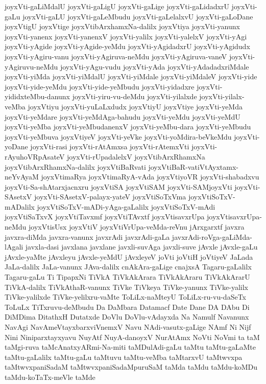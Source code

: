 {joyxVti-gaLiMdalU
joyxVti-gaLigU
joyxVti-gaLige
joyxVti-gaLidadxrU
joyxVti-gaLu
joyxVti-gaLU
joyxVti-gaLeMbudu
joyxVti-gaLelalxvU
joyxVti-gaLoDane
joyxVtigU
joyxVtige
joyxVtibArxhamxNa-dalilx
joyxVtiya
joyxVti-yanunx
joyxVti-yanenx
joyxVti-yanenxV
joyxVti-yalilx
joyxVti-yalelxV
joyxVti-yAgi
joyxVti-yAgide
joyxVti-yAgide-yeMdu
joyxVti-yAgidadxrU
joyxVti-yAgidudx
joyxVti-yAgiru-vanu
joyxVti-yAgiruva-neMdu
joyxVti-yAgiruva-vaneV
joyxVti-yAgiruvu-neMdu
joyxVti-yAgu-vudu
joyxVti-yAda
joyxVti-yAdadadxriMdale
joyxVti-yiMda
joyxVti-yiMdalU
joyxVti-yiMdale
joyxVti-yiMdaleV
joyxVti-yide
joyxVti-yide-yeMdu
joyxVti-yide-yeMbudu
joyxVti-yidadxre
joyxVti-yididxteMbu-danunx
joyxVti-yiru-vu-deMdu
joyxVti-yilalxde
joyxVti-yilalx-veMba
joyxVtiyu
joyxVti-yuLaLxdudx
joyxVtiyU
joyxVtiye
joyxVti-yeMda
joyxVti-yeMdare
joyxVti-yeMdAga-bahudu
joyxVti-yeMdu
joyxVti-yeMdU
joyxVti-yeMba
joyxVti-yeMbudanenxV
joyxVti-yeMbu-dara
joyxVti-yeMbudu
joyxVti-yeMbuva
joyxVtiyeV
joyxVti-yeVke
joyxVti-yoMdira-beVkeMdu
joyxVti-yoDane
joyxVti-rasi
joyxVti-rAtAmxsa
joyxVti-rAtemxVti
joyxVti-rAyuhoVRpAsateV
joyxVti-rUpadalelxV
joyxVtibArxRhamxNa
joyxVtibArxRhamxNa-dalilx
joyxVtiBaRvati
joyxVtiBaR-vatiVtAyxtamx-neYvAyaM
joyxVtimaRya
joyxVtimaRyA-vAda
joyxVtiyoVR
joyxVti-shabadxvu
joyxVti-Sa-shAtarxjacnxru
joyxVtiSA
joyxVtiSAM
joyxVti-SAMjoyxVti
joyxVti-SAsetxV
joyxVti-SAsetxV-palayx-yateV
joyxVtiSoTxVma
joyxVtiSoTxV-mADalilx
joyxVtiSoTxV-mADi-yAga-gaLalilx
joyxVtiSoTxV-mAdi
joyxVtiSaTxvX
joyxVtiTavxmf
joyxVtiTAvxtf
joyxVtisavxrUpa
joyxVtisavxrUpa-neMdu
joyxVtisUsx
joyxVtiV
joyxVtiVrUpa-veMda-reVnu
jArxgarxtf
javxra
javxra-diMda
javxra-vanunx
javxrAdi
javxrAdi-gaLa
javxrAdi-roVga-gaLiMda-lAgali
javxla-dasi
javxlana
javxlane
javxli-suvAga
javxli-suve
jAvxle
jAvxle-gaLu
jAvxle-yaMte
jAvxleyu
jAvxle-yeMdU
jAvxleyeV
joVti
joVtiH
joVtiyeV
JaLada
JaLa-dalilx
JaLa-vanunx
JAva-dalilx
cnAkAra-gaLige
cnajxsA
Tagaru-gaLalilx
Tagaru-gaLu
Ti
TipapxNi
TiVkA
TiVkAkArara
TiVkAkAraru
TiVkAkArarU
TiVkA-dalilx
TiVkAthaR-vanunx
TiVke
TiVkeya
TiVke-yanunx
TiVke-yalilx
TiVke-yalilxde
TiVke-yelilxru-vaMte
ToLiLx-naMteyU
ToLiLx-ru-vu-daSeTx
ToLuLx
TiTxruvu-deMbudu
Da
DaMbara
Datamacf
Date
Dane
DA
DAbu
Di
DiMDima
DitathxH
Dutatxde
DoVlu
DoVlu-vAdayxda
Na
Namulf
Navanunx
NavAgi
NavAmeVtayxbarxviVnemxV
Navu
NAdi-vasutx-gaLige
NAmf
Ni
Nijf
Nini
Niniparxtayxyavu
NuyAtf
NuyA-danoyxV
NurAtAmx
NoVti
NoVmi
ta
taM
taMgi-ruva
taMcAnatxyARmi-Na-miti
taMDulAdi-gaLu
taMtu
taMtu-gaLaMte
taMtu-gaLalilx
taMtu-gaLu
taMtuvu
taMtu-veMba
taMtarxvU
taMtwvxpa
taMtwvxpaniSadaM
taMtwvxpaniSadaMpuruSaM
taMda
taMdu
taMdu-koMDu
taMdu-koTaTx-meVle
taMde
}
